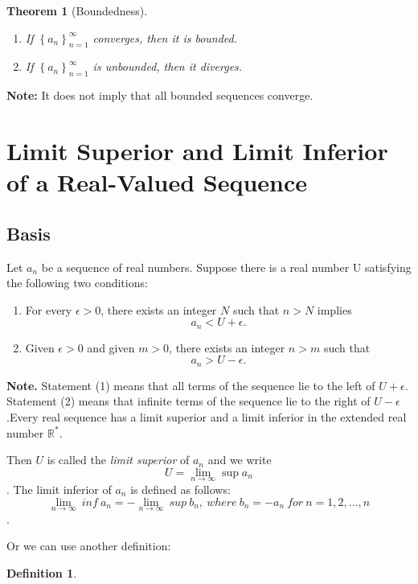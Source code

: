 \documentclass{article}
\newtheorem{theorem}{Theorem}[section]
\theoremstyle{definition}
\newtheorem{defi}{Definition}[section]
\begin{document}
\begin{theorem}[Boundedness]
    \begin{enumerate}
        \item If $\left\{a_{n}\right\}_{n=1}^{\infty}$ converges, then it is bounded.
        \item If $\left\{a_{n}\right\}_{n=1}^{\infty}$ is unbounded, then it diverges.
    \end{enumerate}
\end{theorem}
\noindent\textbf{Note:} It does not imply that all bounded sequences converge. 



\section{Limit Superior and Limit Inferior of a Real-Valued Sequence}
\subsection{Basis}
Let ${a_{n}}$ be a sequence of real numbers. Suppose there is a real number U 
satisfying the following two conditions:

\begin{enumerate}
    \item For every $\epsilon > 0$, there exists an integer $N$ such that $n>N$ 
    implies $$a_{n}<U+\epsilon.$$
    \item Given $\epsilon>0$ and given $m>0$, there exists an integer $n>m$ such that 
    $$a_{n}>U-\epsilon.$$ 
\end{enumerate}

\textbf{Note.} Statement (1) means that all terms of the sequence lie to the left 
of $U+\epsilon$. Statement (2) means that infinite terms of the sequence lie to the 
right of $U-\epsilon$.Every real sequence has a limit superior and a limit inferior 
in the extended real number $\mathbb{R^{*}}$.

Then $U$ is called the \textit{limit superior} of ${a_{n}}$
and we write $$U=\lim_{n\rightarrow \infty}\sup{a_{n}}$$.
The limit inferior of ${a_{n}}$ is defined as follows:
$$\lim_{n\rightarrow \infty}\ inf\ a_{n}=-\lim_{n\rightarrow \infty}\ sup\ b_{n},\ where\ b_{n}=-a_{n}\ for\ n=1,2,...,n$$.

Or we can use another definition:
\begin{defi}


\end{defi}    
\end{document}

